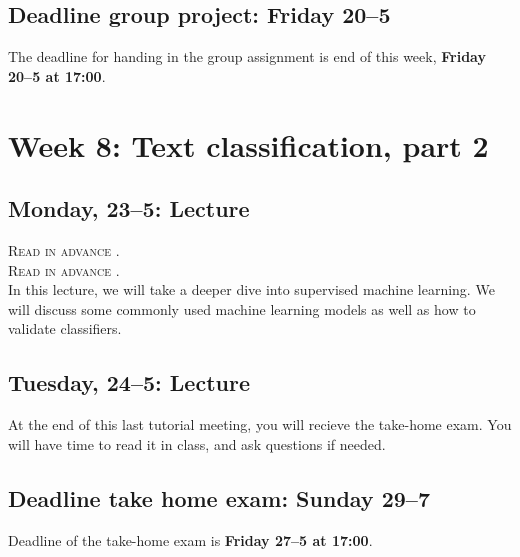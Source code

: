 \subsection*{Deadline group project: Friday 20--5}
The deadline for handing in the group assignment is end of this week, \textbf{Friday 20--5 at 17:00}.

\section*{Week 8: Text classification, part 2}

\subsection*{Monday, 23--5: Lecture}
\textsc{ Read in advance \cite{jordan_mitchell}.}\\
\textsc{ Read in advance \cite{meppelink_reliable_2021}.}\\

In this lecture, we will take a deeper dive into supervised machine learning. We will discuss some commonly used machine learning models as well as how to validate classifiers.

\subsection*{Tuesday, 24--5: Lecture}
At the end of this last tutorial meeting, you will recieve the take-home exam. You will have time to read it in class, and ask questions if needed. \\

\subsection*{Deadline take home exam: Sunday 29--7}
Deadline of the take-home exam is \textbf{Friday 27--5 at 17:00}.







